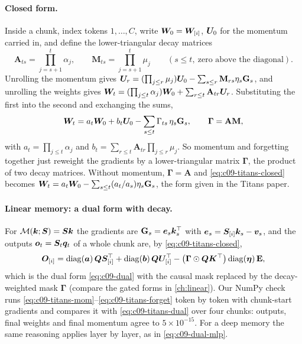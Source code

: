 \paragraph{Closed form.} Inside a chunk, index tokens $1,\dots,C$, write $\bm{W}_0 = \bm{W}_{[i]}$,
$\bm{U}_0$ for the momentum carried in, and define the lower-triangular decay matrices
\begin{equation}
  \mathbf{A}_{ts} = \prod_{j=s+1}^{t}\alpha_j, \qquad
  \mathbf{M}_{ts} = \prod_{j=s+1}^{t}\mu_j \qquad (s \le t,\ \text{zero above the diagonal}).
\end{equation}
Unrolling the momentum gives
$\bm{U}_r = (\prod_{j\le r}\mu_j)\bm{U}_0 - \sum_{s\le r}\mathbf{M}_{rs}\eta_s\mathbf{G}_s$, and
unrolling the weights gives $\bm{W}_t = (\prod_{j\le t}\alpha_j)\bm{W}_0 + \sum_{r\le t}\mathbf{A}_{tr}\bm{U}_r$.
Substituting the first into the second and exchanging the sums,
\begin{equation}\label{eq:c09-titans-closed}
  \bm{W}_t = a_t\bm{W}_0 + b_t\bm{U}_0 - \sum_{s\le t}\Gamma_{ts}\,\eta_s\mathbf{G}_s, \qquad
  \bm{\Gamma} = \mathbf{A}\mathbf{M},
\end{equation}
with $a_t = \prod_{j\le t}\alpha_j$ and $b_t = \sum_{r\le t}\mathbf{A}_{tr}\prod_{j\le r}\mu_j$.
So momentum and forgetting together just reweight the gradients by a lower-triangular matrix
$\bm{\Gamma}$, the product of two decay matrices. Without momentum, $\bm{\Gamma} = \mathbf{A}$
and \eqref{eq:c09-titans-closed} becomes $\bm{W}_t = a_t\bm{W}_0 - \sum_{s\le t}(a_t/a_s)\eta_s
\mathbf{G}_s$, the form given in the Titans paper.

\paragraph{Linear memory: a dual form with decay.} For $\mathcal{M}(\bm{k};\bm{S}) = \bm{S}\bm{k}$ the
gradients are $\mathbf{G}_s = \bm{e}_s\bm{k}_s^{\top}$ with $\bm{e}_s = \bm{S}_{[i]}\bm{k}_s - \bm{v}_s$, and the
outputs $\bm{o}_t = \bm{S}_t\bm{q}_t$ of a whole chunk are, by \eqref{eq:c09-titans-closed},
\begin{equation}\label{eq:c09-titans-dual}
  \bm{O}_{[i]} = \operatorname{diag}(\bm{a})\,\bm{Q}\bm{S}_{[i]}^{\top} + \operatorname{diag}(\bm{b})\,\bm{Q}\bm{U}_{[i]}^{\top}
     - \big(\bm{\Gamma}\odot\bm{Q}\bm{K}^{\top}\big)\operatorname{diag}(\bm{\eta})\,\mathbf{E},
\end{equation}
which is the dual form \eqref{eq:c09-dual} with the causal mask replaced by the decay-weighted
mask $\bm{\Gamma}$ (compare the gated forms in \cref{ch:linear}). Our NumPy check runs
\eqref{eq:c09-titans-mom}--\eqref{eq:c09-titans-forget} token by token with chunk-start
gradients and compares it with \eqref{eq:c09-titans-dual} over four chunks: outputs, final
weights and final momentum agree to $5\times10^{-15}$. For a deep memory the same reasoning
applies layer by layer, as in \eqref{eq:c09-dual-mlp}.

